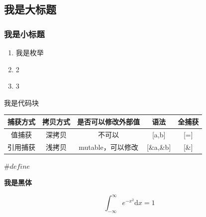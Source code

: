 \subsection{我是大标题}

\subsubsection{我是小标题}

\begin{enumerate}
    \item 我是枚举
    \item 2
    \item 3
\end{enumerate}


\begin{tcode}
我是代码块
    \end{tcode}    


    \begin{center}

        \begin{tabular}{ccccc}
            \hline
            捕获方式 & 拷贝方式 & 是否可以修改外部值 & 语法 & 全捕获\\
            \hline
            值捕获 & 深拷贝 & 不可以 & [a,b] & [=]\\
            引用捕获 & 浅拷贝 & mutable，可以修改 & [\&a,\&b] & [\&]\\
            \hline
            
        \end{tabular}
    \end{center}


    $\#define$ 
    
    
    \textbf{我是黑体}

    \begin{equation}
        \int_{-\infty}^{\infty}e^{-x^2}\mathrm{d}x=1
    \end{equation}